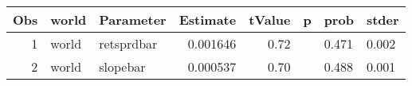

\begin{longtable}{|r|l|l|r|r|l|l|l|}\hline
   Obs &    world &    Parameter &    Estimate &    tValue &    p &    prob &    stder\\\hline
\endhead
   1 &    world &    retsprdbar &    0.001646 &    0.72 &      &    0.471 &    0.002\\\hline
   2 &    world &    slopebar &    0.000537 &    0.70 &      &    0.488 &    0.001\\\hline
\end{longtable}

